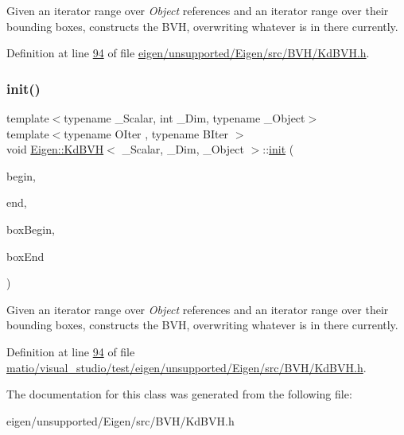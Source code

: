 Given an iterator range over {\itshape Object} references and an iterator range over their bounding boxes, constructs the B\+VH, overwriting whatever is in there currently. 

Definition at line \hyperlink{eigen_2unsupported_2_eigen_2src_2_b_v_h_2_kd_b_v_h_8h_source_l00094}{94} of file \hyperlink{eigen_2unsupported_2_eigen_2src_2_b_v_h_2_kd_b_v_h_8h_source}{eigen/unsupported/\+Eigen/src/\+B\+V\+H/\+Kd\+B\+V\+H.\+h}.

\mbox{\label{class_eigen_1_1_kd_b_v_h_a10a9c8f6d596d7a2cd285a3fb3e8c053}} 
\subsubsection{\texorpdfstring{init()}{init()}\hspace{0.1cm}{\footnotesize\ttfamily [4/4]}}
{\footnotesize\ttfamily template$<$typename \+\_\+\+Scalar, int \+\_\+\+Dim, typename \+\_\+\+Object$>$ \\
template$<$typename O\+Iter , typename B\+Iter $>$ \\
void \hyperlink{class_eigen_1_1_kd_b_v_h}{Eigen\+::\+Kd\+B\+VH}$<$ \+\_\+\+Scalar, \+\_\+\+Dim, \+\_\+\+Object $>$\+::\hyperlink{structinit}{init} (\begin{DoxyParamCaption}\item[{O\+Iter}]{begin,  }\item[{O\+Iter}]{end,  }\item[{B\+Iter}]{box\+Begin,  }\item[{B\+Iter}]{box\+End }\end{DoxyParamCaption})\hspace{0.3cm}{\ttfamily [inline]}}

Given an iterator range over {\itshape Object} references and an iterator range over their bounding boxes, constructs the B\+VH, overwriting whatever is in there currently. 

Definition at line \hyperlink{matio_2visual__studio_2test_2eigen_2unsupported_2_eigen_2src_2_b_v_h_2_kd_b_v_h_8h_source_l00094}{94} of file \hyperlink{matio_2visual__studio_2test_2eigen_2unsupported_2_eigen_2src_2_b_v_h_2_kd_b_v_h_8h_source}{matio/visual\+\_\+studio/test/eigen/unsupported/\+Eigen/src/\+B\+V\+H/\+Kd\+B\+V\+H.\+h}.



The documentation for this class was generated from the following file\+:\begin{DoxyCompactItemize}
\item 
eigen/unsupported/\+Eigen/src/\+B\+V\+H/\+Kd\+B\+V\+H.\+h\end{DoxyCompactItemize}

